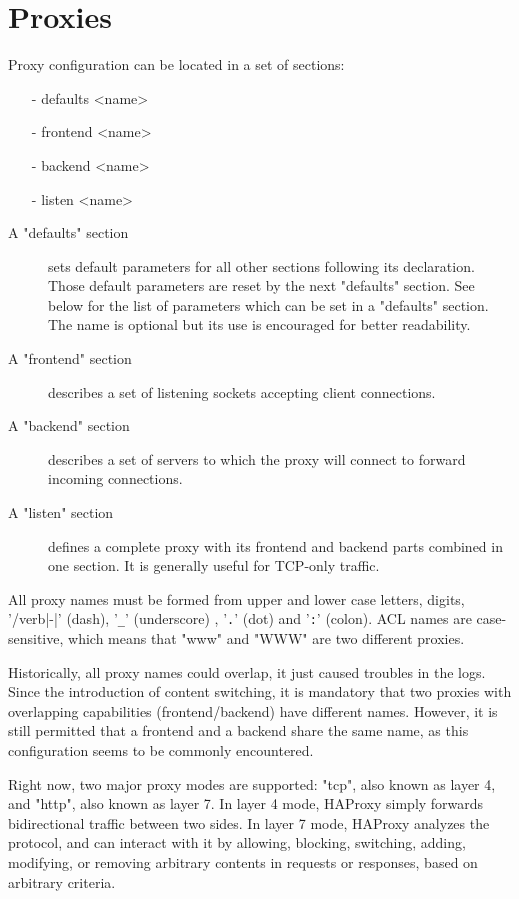 \chapter{Proxies}

Proxy configuration can be located in a set of sections:
\begin{itemize}
\item[-] defaults <name>
\item[-] frontend <name>
\item[-] backend  <name>
\item[-] listen   <name>
\end{itemize}

\begin{description}
\item[A "defaults" section] sets default parameters for all other sections following
its declaration. Those default parameters are reset by the next "defaults"
section. See below for the list of parameters which can be set in a "defaults"
section. The name is optional but its use is encouraged for better readability.

\item[A "frontend" section] describes a set of listening sockets accepting client
connections.

\item[A "backend" section] describes a set of servers to which the proxy will connect
to forward incoming connections.

\item[A "listen" section] defines a complete proxy with its frontend and backend
parts combined in one section. It is generally useful for TCP-only traffic.
\end{description}

All proxy names must be formed from upper and lower case letters, digits,
'/verb|-|' (dash), '\verb|_|' (underscore) , '\verb|.|' (dot) and '\verb|:|' (colon). ACL names are
case-sensitive, which means that "www" and "WWW" are two different proxies.

Historically, all proxy names could overlap, it just caused troubles in the
logs. Since the introduction of content switching, it is mandatory that two
proxies with overlapping capabilities (frontend/backend) have different names.
However, it is still permitted that a frontend and a backend share the same
name, as this configuration seems to be commonly encountered.

Right now, two major proxy modes are supported: "tcp", also known as layer 4,
and "http", also known as layer 7. In layer 4 mode, HAProxy simply forwards
bidirectional traffic between two sides. In layer 7 mode, HAProxy analyzes the
protocol, and can interact with it by allowing, blocking, switching, adding,
modifying, or removing arbitrary contents in requests or responses, based on
arbitrary criteria.

